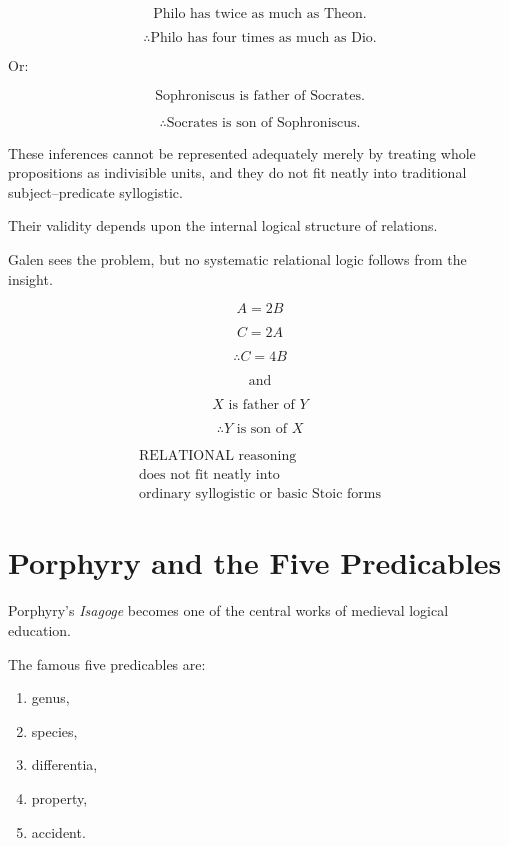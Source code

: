 \documentclass[11pt]{article}
\begin{document}
\[
\text{Philo has twice as much as Theon.}
\]

\[
\therefore \text{Philo has four times as much as Dio.}
\]

Or:

\[
\text{Sophroniscus is father of Socrates.}
\]

\[
\therefore \text{Socrates is son of Sophroniscus.}
\]

These inferences cannot be represented adequately merely by
treating whole propositions as indivisible units, and they do not
fit neatly into traditional subject--predicate syllogistic.

Their validity depends upon the internal logical structure of
relations.

Galen sees the problem, but no systematic relational logic
follows from the insight.

\begin{whiteboard}
\[
A = 2B
\]

\[
C = 2A
\]

\[
\therefore C = 4B
\]

\[
\text{and}
\]

\[
X\text{ is father of }Y
\]

\[
\therefore Y\text{ is son of }X
\]

\[
\boxed{
\begin{array}{c}
\text{RELATIONAL reasoning}\\
\text{does not fit neatly into}\\
\text{ordinary syllogistic or basic Stoic forms}
\end{array}
}
\]
\end{whiteboard}

\section{Porphyry and the Five Predicables}

Porphyry's \textit{Isagoge} becomes one of the central works of
medieval logical education.

The famous five predicables are:

\begin{enumerate}
    \item genus,
    \item species,
    \item differentia,
    \item property,
    \item accident.
\end{enumerate}
\end{document}
